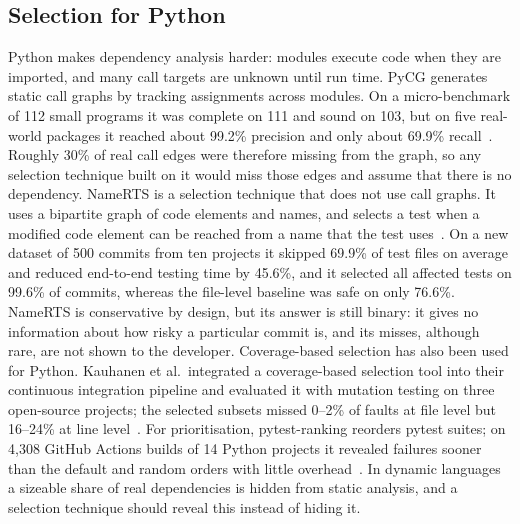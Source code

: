 \documentclass[conference]{IEEEtran}
\begin{document}
\subsection{Selection for Python}
Python makes dependency analysis harder: modules execute code when they are imported, and many call targets are unknown until run time. PyCG generates static call graphs by tracking assignments across modules. On a micro-benchmark of 112 small programs it was complete on 111 and sound on 103, but on five real-world packages it reached about 99.2\% precision and only about 69.9\% recall~\cite{salis2021pycg}. Roughly 30\% of real call edges were therefore missing from the graph, so any selection technique built on it would miss those edges and assume that there is no dependency. NameRTS is a selection technique that does not use call graphs. It uses a bipartite graph of code elements and names, and selects a test when a modified code element can be reached from a name that the test uses~\cite{wang2026namerts}. On a new dataset of 500 commits from ten projects it skipped 69.9\% of test files on average and reduced end-to-end testing time by 45.6\%, and it selected all affected tests on 99.6\% of commits, whereas the file-level baseline was safe on only 76.6\%. NameRTS is conservative by design, but its answer is still binary: it gives no information about how risky a particular commit is, and its misses, although rare, are not shown to the developer. Coverage-based selection has also been used for Python. Kauhanen et al.\ integrated a coverage-based selection tool into their continuous integration pipeline and evaluated it with mutation testing on three open-source projects; the selected subsets missed 0--2\% of faults at file level but 16--24\% at line level~\cite{kauhanen2021python}. For prioritisation, pytest-ranking reorders pytest suites; on 4,308 GitHub Actions builds of 14 Python projects it revealed failures sooner than the default and random orders with little overhead~\cite{cheng2025pytestranking}. In dynamic languages a sizeable share of real dependencies is hidden from static analysis, and a selection technique should reveal this instead of hiding it.
\end{document}
